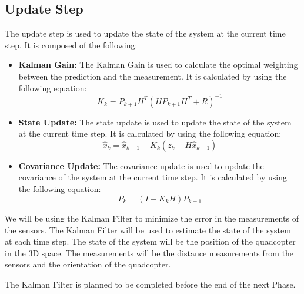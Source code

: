 \documentclass[12pt]{article}
\numberwithin{equation}{section}
\begin{document}
\subsection{Update Step}
The update step is used to update the state of the system at the current time step. It is composed of the following:
\begin{itemize}
  \item \textbf{Kalman Gain:} The Kalman Gain is used to calculate the optimal weighting between the prediction and the measurement. It is calculated by using the following equation:
    \begin{equation}
      K_k = P_{k+1} H^T (H P_{k+1} H^T + R)^{-1}
    \end{equation}
  \item \textbf{State Update:} The state update is used to update the state of the system at the current time step. It is calculated by using the following equation:
    \begin{equation}
      \hat{x}_k = \hat{x}_{k+1} + K_k (z_k - H \hat{x}_{k+1})
    \end{equation}
  \item \textbf{Covariance Update:} The covariance update is used to update the covariance of the system at the current time step. It is calculated by using the following equation:
    \begin{equation}
      P_k = (I - K_k H) P_{k+1}
    \end{equation}
\end{itemize}

We will be using the Kalman Filter to minimize the error in the measurements of the sensors. The Kalman Filter will be used to estimate the state of the system at each time step. The state of the system will be the position of the quadcopter in the 3D space. The measurements will be the distance measurements from the sensors and the orientation of the quadcopter.

The Kalman Filter is planned to be completed before the end of the next Phase.
\end{document}
